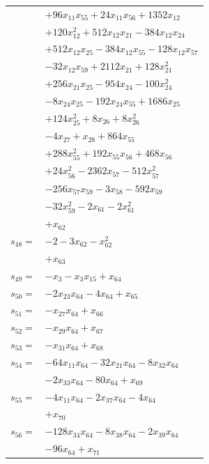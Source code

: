 \begin{longtable}{@{}r@{\;}l@{}}
 & \(\displaystyle +96x_{11}x_{55} +24x_{11}x_{56} +1352x_{12}\) \\
 & \(\displaystyle +120x_{12}^{2} +512x_{12}x_{21} -384x_{12}x_{24}\) \\
 & \(\displaystyle +512x_{12}x_{25} -384x_{12}x_{55} -128x_{12}x_{57}\) \\
 & \(\displaystyle -32x_{12}x_{59} +2112x_{21} +128x_{21}^{2}\) \\
 & \(\displaystyle +256x_{21}x_{25} -954x_{24} -100x_{24}^{2}\) \\
 & \(\displaystyle -8x_{24}x_{25} -192x_{24}x_{55} +1686x_{25}\) \\
 & \(\displaystyle +124x_{25}^{2} +8x_{26} +8x_{26}^{2}\) \\
 & \(\displaystyle -4x_{27} +x_{28} +864x_{55}\) \\
 & \(\displaystyle +288x_{55}^{2} +192x_{55}x_{56} +468x_{56}\) \\
 & \(\displaystyle +24x_{56}^{2} -2362x_{57} -512x_{57}^{2}\) \\
 & \(\displaystyle -256x_{57}x_{59} -3x_{58} -592x_{59}\) \\
 & \(\displaystyle -32x_{59}^{2} -2x_{61} -2x_{61}^{2}\) \\
 & \(\displaystyle +x_{62}\) \\[3pt]
\(s_{48}=\) & \(\displaystyle -2 -3x_{62} -x_{62}^{2}\) \\
 & \(\displaystyle +x_{63}\) \\[3pt]
\(s_{49}=\) & \(\displaystyle -x_{3} -x_{3}x_{15} +x_{64}\) \\[3pt]
\(s_{50}=\) & \(\displaystyle -2x_{23}x_{64} -4x_{64} +x_{65}\) \\[3pt]
\(s_{51}=\) & \(\displaystyle -x_{27}x_{64} +x_{66}\) \\[3pt]
\(s_{52}=\) & \(\displaystyle -x_{29}x_{64} +x_{67}\) \\[3pt]
\(s_{53}=\) & \(\displaystyle -x_{31}x_{64} +x_{68}\) \\[3pt]
\(s_{54}=\) & \(\displaystyle -64x_{11}x_{64} -32x_{21}x_{64} -8x_{32}x_{64}\) \\
 & \(\displaystyle -2x_{33}x_{64} -80x_{64} +x_{69}\) \\[3pt]
\(s_{55}=\) & \(\displaystyle -4x_{11}x_{64} -2x_{37}x_{64} -4x_{64}\) \\
 & \(\displaystyle +x_{70}\) \\[3pt]
\(s_{56}=\) & \(\displaystyle -128x_{34}x_{64} -8x_{38}x_{64} -2x_{39}x_{64}\) \\
 & \(\displaystyle -96x_{64} +x_{71}\) \\[3pt]

\end{longtable}

